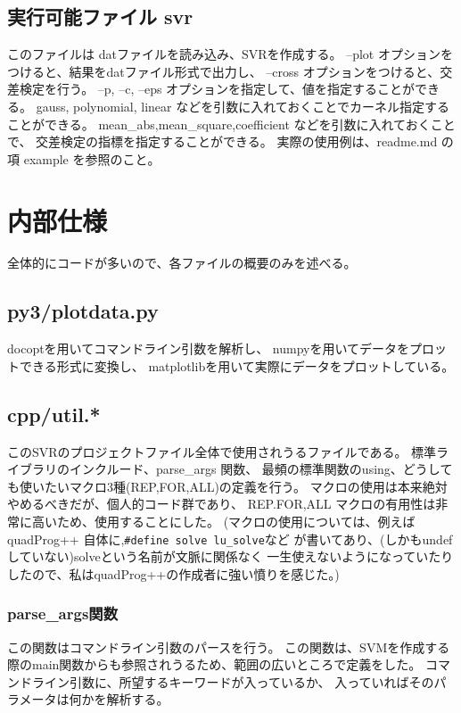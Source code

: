 \documentclass[]{jsarticle}
\begin{document}
\subsection{実行可能ファイル svr}
このファイルは datファイルを読み込み、SVRを作成する。
--plot オプションをつけると、結果をdatファイル形式で出力し、
--cross オプションをつけると、交差検定を行う。
--p, --c, --eps オプションを指定して、値を指定することができる。
gauss, polynomial, linear などを引数に入れておくことでカーネル指定することができる。
mean\_abs,mean\_square,coefficient などを引数に入れておくことで、
交差検定の指標を指定することができる。
実際の使用例は、readme.md の項 example を参照のこと。


\section{内部仕様}
全体的にコードが多いので、各ファイルの概要のみを述べる。

\subsection{py3/plotdata.py}
docoptを用いてコマンドライン引数を解析し、
numpyを用いてデータをプロットできる形式に変換し、
matplotlibを用いて実際にデータをプロットしている。


\subsection{cpp/util.*}
このSVRのプロジェクトファイル全体で使用されうるファイルである。
標準ライブラリのインクルード、parse\_args 関数、
最頻の標準関数のusing、どうしても使いたいマクロ3種(REP,FOR,ALL)の定義を行う。
マクロの使用は本来絶対やめるべきだが、個人的コード群であり、
REP.FOR,ALL マクロの有用性は非常に高いため、使用することにした。
(マクロの使用については、例えばquadProg++ 自体に,\verb|#define solve lu_solve|など
が書いてあり、(しかもundefしていない)solveという名前が文脈に関係なく
一生使えないようになっていたりしたので、私はquadProg++の作成者に強い憤りを感じた。)
\subsubsection{ parse\_args関数 }
この関数はコマンドライン引数のパースを行う。
この関数は、SVMを作成する際のmain関数からも参照されうるため、範囲の広いところで定義をした。
コマンドライン引数に、所望するキーワードが入っているか、
入っていればそのパラメータは何かを解析する。
\end{document}
